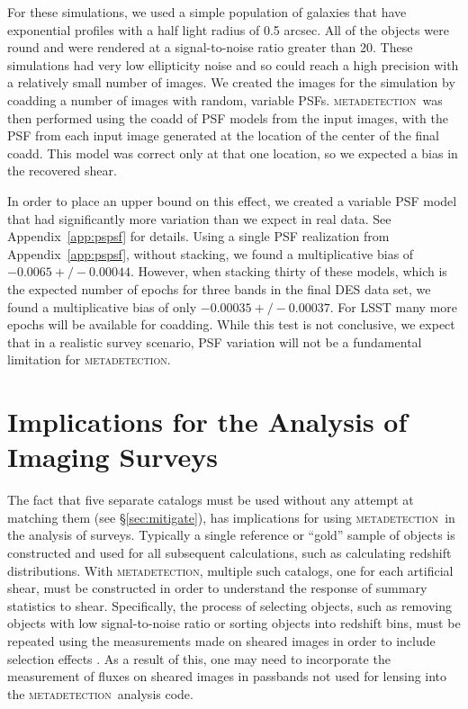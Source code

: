 \documentclass[fleqn,useAMS,usenatbib]{mnras}
\newcommand{\mdet}{\textsc{metadetection}}
\begin{document}
For these simulations, we used a simple population of galaxies that have
exponential profiles with a half light radius of 0.5 arcsec. All of the objects
were round and were rendered at a signal-to-noise ratio greater than 20. These
simulations had very low ellipticity noise and so could reach a high precision
with a relatively small number of images. We created the images for the
simulation by coadding a number of images with random, variable PSFs.  \mdet\
was then performed using the coadd of PSF models from the input images, with
the PSF from each input image generated at the location of the center of the
final coadd.  This model was correct only at that one location, so we expected
a bias in the recovered shear.

In order to place an upper bound on this effect, we created a variable PSF
model that had significantly more variation than we expect in real data. See
Appendix~\ref{app:pspsf} for details.  Using a single PSF realization from
Appendix~\ref{app:pspsf}, without stacking, we found a multiplicative bias of
$-0.0065 +/- 0.00044$.  However, when stacking thirty of these models, which is
the expected number of epochs for three bands in the final DES data set, we
found a multiplicative bias of only $-0.00035 +/- 0.00037$.  For LSST many more
epochs will be available for coadding.   While this test is not conclusive, we
expect that in a realistic survey scenario, PSF variation will not be a
fundamental limitation for \mdet.

\section{Implications for the Analysis of Imaging Surveys} \label{sec:wavg}

The fact that five separate catalogs must be used without any attempt at
matching them (see \S \ref{sec:mitigate}), has implications for using \mdet\ in
the analysis of surveys.  Typically a single reference or ``gold'' sample of
objects is constructed and used for all subsequent calculations, such as
calculating redshift distributions.  With \mdet, multiple such catalogs, one
for each artificial shear, must be constructed in order to understand the
response of summary statistics to shear.  Specifically, the process of
selecting objects, such as removing objects with low signal-to-noise ratio or
sorting objects into redshift bins, must be repeated using the measurements made on
sheared images in order to include selection effects \citep{SheldonMcal2017}.
As a result of this, one may need to incorporate the measurement of fluxes
on sheared images in passbands not used for lensing into the \mdet\ analysis
code.
\end{document}
